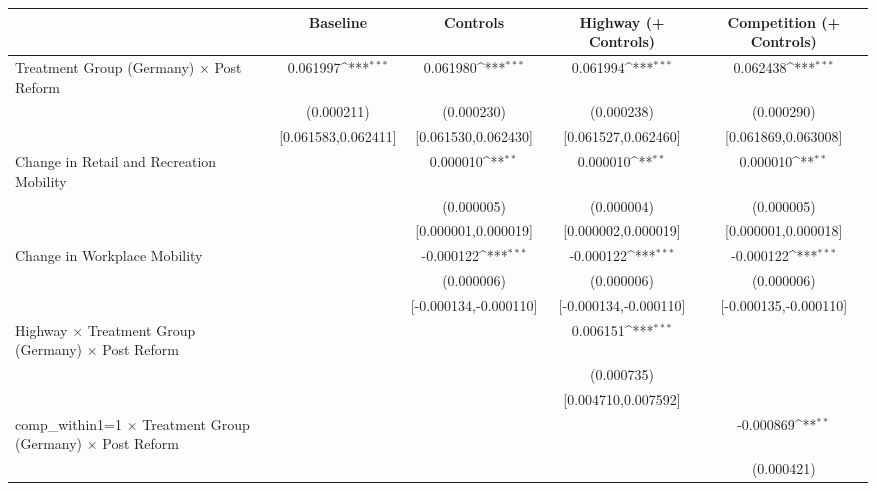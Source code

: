 {
\def\sym#1{\ifmmode^{#1}\else\(^{#1}\)\fi}
\begin{tabular}{l*{4}{c}}
\toprule
                    &\multicolumn{1}{c}{Baseline}&\multicolumn{1}{c}{Controls}&\multicolumn{1}{c}{Highway (+ Controls)}&\multicolumn{1}{c}{Competition (+ Controls)}\\
\midrule
Treatment Group (Germany) $\times$ Post Reform&    0.061997\sym{***}&    0.061980\sym{***}&    0.061994\sym{***}&    0.062438\sym{***}\\
                    &  (0.000211)         &  (0.000230)         &  (0.000238)         &  (0.000290)         \\
                    &[0.061583,0.062411]         &[0.061530,0.062430]         &[0.061527,0.062460]         &[0.061869,0.063008]         \\
Change in Retail and Recreation Mobility&                     &    0.000010\sym{**} &    0.000010\sym{**} &    0.000010\sym{**} \\
                    &                     &  (0.000005)         &  (0.000004)         &  (0.000005)         \\
                    &                     &[0.000001,0.000019]         &[0.000002,0.000019]         &[0.000001,0.000018]         \\
Change in Workplace Mobility&                     &   -0.000122\sym{***}&   -0.000122\sym{***}&   -0.000122\sym{***}\\
                    &                     &  (0.000006)         &  (0.000006)         &  (0.000006)         \\
                    &                     &[-0.000134,-0.000110]         &[-0.000134,-0.000110]         &[-0.000135,-0.000110]         \\
Highway $\times$ Treatment Group (Germany) $\times$ Post Reform&                     &                     &    0.006151\sym{***}&                     \\
                    &                     &                     &  (0.000735)         &                     \\
                    &                     &                     &[0.004710,0.007592]         &                     \\
comp\_within1=1 $\times$ Treatment Group (Germany) $\times$ Post Reform&                     &                     &                     &   -0.000869\sym{**} \\
                    &                     &                     &                     &  (0.000421)         \\

\end{tabular}}
